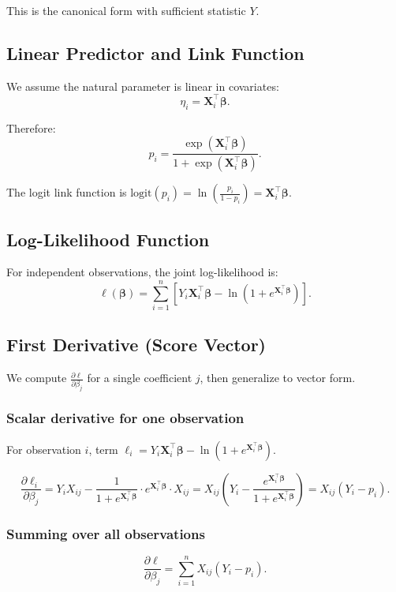\documentclass[12pt]{article}
\numberwithin{equation}{section}
\begin{document}
	This is the canonical form with sufficient statistic $Y$.
	
	\subsection{Linear Predictor and Link Function}
	
	We assume the natural parameter is linear in covariates:
	\[
	\eta_i = \mathbf{X}_i^\top \boldsymbol{\beta}.
	\]
	
	Therefore:
	\[
	p_i = \frac{\exp(\mathbf{X}_i^\top \boldsymbol{\beta})}{1 + \exp(\mathbf{X}_i^\top \boldsymbol{\beta})}.
	\]
	
	The logit link function is $\text{logit}(p_i) = \ln\left(\frac{p_i}{1-p_i}\right) = \mathbf{X}_i^\top \boldsymbol{\beta}$.
	
	\subsection{Log-Likelihood Function}
	
	For independent observations, the joint log-likelihood is:
	\[
	\ell(\boldsymbol{\beta}) = \sum_{i=1}^n \left[ Y_i \mathbf{X}_i^\top \boldsymbol{\beta} - \ln\left(1 + e^{\mathbf{X}_i^\top \boldsymbol{\beta}}\right) \right].
	\]
	
	\subsection{First Derivative (Score Vector)}
	
	We compute $\frac{\partial \ell}{\partial \beta_j}$ for a single coefficient $j$, then generalize to vector form.
	
	\subsubsection{Scalar derivative for one observation}
	For observation $i$, term $\ell_i = Y_i \mathbf{X}_i^\top \boldsymbol{\beta} - \ln(1 + e^{\mathbf{X}_i^\top \boldsymbol{\beta}})$.
	
	\[
	\frac{\partial \ell_i}{\partial \beta_j} = Y_i X_{ij} - \frac{1}{1+e^{\mathbf{X}_i^\top \boldsymbol{\beta}}} \cdot e^{\mathbf{X}_i^\top \boldsymbol{\beta}} \cdot X_{ij} = X_{ij} \left( Y_i - \frac{e^{\mathbf{X}_i^\top \boldsymbol{\beta}}}{1+e^{\mathbf{X}_i^\top \boldsymbol{\beta}}} \right) = X_{ij} (Y_i - p_i).
	\]
	
	\subsubsection{Summing over all observations}
	\[
	\frac{\partial \ell}{\partial \beta_j} = \sum_{i=1}^n X_{ij} (Y_i - p_i).
	\]
	
\end{document}
